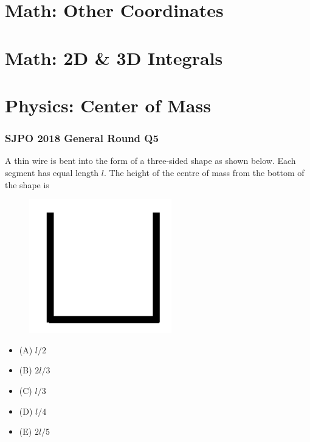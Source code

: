 \documentclass{article}
\begin{document}
\section{Math: Other Coordinates}
\section{Math: 2D \& 3D Integrals}
\clearpage
\section{Physics: Center of Mass}
\subsubsection{SJPO 2018 General Round Q5}
A thin wire is bent into the form of a three-sided shape as shown below. Each segment has equal length $l$. The height of the centre of mass from the bottom of the shape is \\
{
\begin{figure}
\includegraphics[width=1.0\linewidth]{images/sjpo2018q5.png}
\end{figure}
\begin{itemize}
\item[] (A) $l / 2$
\item[] (B) $2 l / 3$
\item[] (C) $l / 3$
\item[] (D) $l / 4$
\item[] (E) $2 l / 5$
\end{itemize}
}
\end{document}
